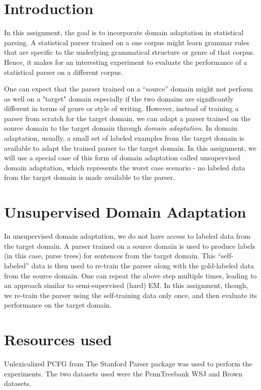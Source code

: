\documentclass{sig-alternate-05-2015}
\begin{document}
\section{Introduction}
In this assignment, the goal is to incorporate domain adaptation in statistical parsing. A statistical parser trained on a one corpus might learn grammar rules that are specific to the underlying grammatical structure or genre of that corpus. Hence, it makes for an interesting experiment to evaluate the performance of a statistical parser on a different corpus.

One can expect that the parser trained on a ``source'' domain might not perform as well on a "target" domain especially if the two domains are significantly different in terms of genre or style of writing. However, instead of training a parser from scratch for the target domain, we can adapt a parser trained on the source domain to the target domain through \textit{domain adaptation}. In domain adaptation, usually, a small set of labeled examples from the target domain is available to adapt the trained parser to the target domain. In this assignment, we will use a special case of this form of domain adaptation called unsupervised domain adaptation, which represents the worst case scenario - no labeled data from the target domain is made available to the parser.

\section{Unsupervised Domain Adaptation}
In unsupervised domain adaptation, we do not have access to labeled data from the target domain. A parser trained on a source domain is used to produce labels (in this case, parse trees) for sentences from the target domain. This ``self-labeled'' data is then used to re-train the parser along with the gold-labeled data from the source domain. One can repeat the above step multiple times, leading to an approach similar to semi-supervised (hard) EM. In this assignment, though, we re-train the parser using the self-training data only once, and then evaluate its performance on the target domain.

\section{Resources used}
Unlexicalized PCFG \cite{klein2003accurate} from The Stanford Parser package \cite{StanParser} was used to perform the experiments. The two datasets used were the PennTreebank WSJ and Brown datasets.
\end{document}
